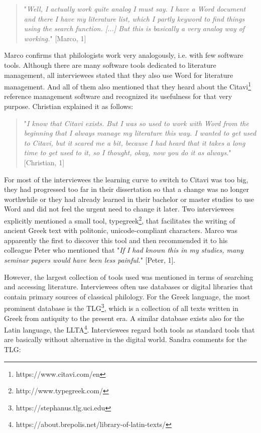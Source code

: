\documentclass[12pt, a4paper, titlepage, oneside, abstract=true, toc=listof, toc=bibliography]{scrreprt}
\begin{document}
\begin{quotation}
"\textit{Well, I actually work quite analog I must say. I have a Word document and there I have my literature list, which I partly keyword to find things using the search function. [...] But this is basically a very analog way of working.}" [Marco, 1]
\end{quotation}

Marco confirms that philologists work very analogously, i.e. with few software tools. Although there are many software tools dedicated to literature management, all interviewees stated that they also use Word for literature management. And all of them also mentioned that they heard about the \gls{Citavi}\footnote{https://www.citavi.com/en} reference management software and recognized its usefulness for that very purpose. Christian explained it as follows:

\begin{quotation}
"\textit{I know that Citavi exists. But I was so used to work with Word from the beginning that I always manage my literature this way. I wanted to get used to Citavi, but it scared me a bit, because I had heard that it takes a long time to get used to it, so I thought, okay, now you do it as always.}" [Christian, 1]
\end{quotation}
 
For most of the interviewees the learning curve to switch to Citavi was too big, they had progressed too far in their dissertation so that a change was no longer worthwhile or they had already learned in their bachelor or master studies to use Word and did not feel the urgent need to change it later. 
Two interviewees explicitly mentioned a small tool, typegreek\footnote{http://www.typegreek.com/}, that facilitates the writing of ancient Greek text with politonic, unicode-compliant characters. Marco was apparently the first to discover this tool and then recommended it to his colleague Peter who mentioned that "\textit{If I had known this in my studies, many seminar papers would have been less painful.}" [Peter, 1].

However, the largest collection of tools used was mentioned in terms of searching and accessing literature. Interviewees often use databases or digital libraries that contain primary sources of classical philology. 
For the Greek language, the most prominent database is the \gls{TLG}\footnote{https://stephanus.tlg.uci.edu}, which is a collection of all texts written in Greek from antiquity to the present era. A similar database exists also for the Latin language, the \gls{LLTA}\footnote{https://about.brepolis.net/library-of-latin-texts/}. Interviewees regard both tools as standard tools that are basically without alternative in the digital world. Sandra comments for the \gls{TLG}: 
\end{document}
